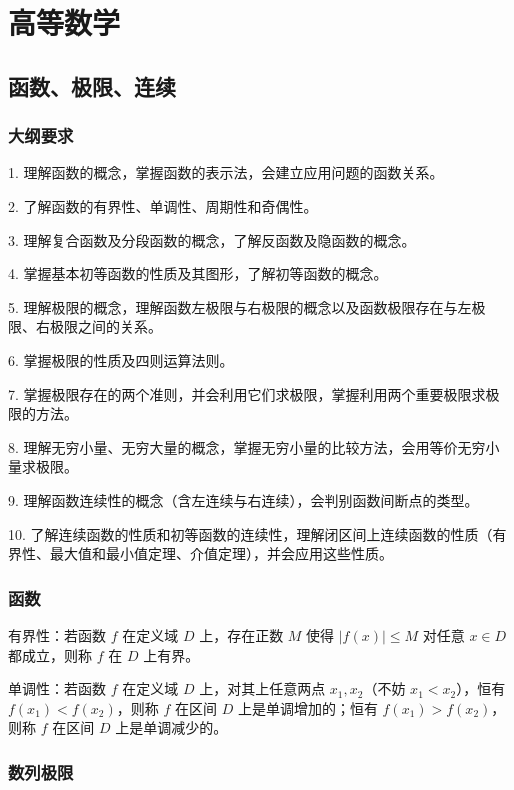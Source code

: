 \chapter{高等数学}

\section{函数、极限、连续}

\subsection{大纲要求}

1. 理解函数的概念，掌握函数的表示法，会建立应用问题的函数关系。

2. 了解函数的有界性、单调性、周期性和奇偶性。

3. 理解复合函数及分段函数的概念，了解反函数及隐函数的概念。

4. 掌握基本初等函数的性质及其图形，了解初等函数的概念。

5. 理解极限的概念，理解函数左极限与右极限的概念以及函数极限存在与左极限、右极限之间的关系。

6. 掌握极限的性质及四则运算法则。

7. 掌握极限存在的两个准则，并会利用它们求极限，掌握利用两个重要极限求极限的方法。

8. 理解无穷小量、无穷大量的概念，掌握无穷小量的比较方法，会用等价无穷小量求极限。

9. 理解函数连续性的概念（含左连续与右连续），会判别函数间断点的类型。

10. 了解连续函数的性质和初等函数的连续性，理解闭区间上连续函数的性质（有界性、最大值和最小值定理、介值定理），并会应用这些性质。

\subsection{函数}

有界性：若函数 $f$ 在定义域 $D$ 上，存在正数 $M$ 使得 $|f(x)| \leqslant M$ 对任意 $x \in D$ 都成立，则称 $f$ 在 $D$ 上有界。

单调性：若函数 $f$ 在定义域 $D$ 上，对其上任意两点 $x_1, x_2$（不妨 $x_1 < x_2$），恒有 $f(x_1) < f(x_2)$，则称 $f$ 在区间 $D$ 上是单调增加的；恒有 $f(x_1) > f(x_2)$，则称 $f$ 在区间 $D$ 上是单调减少的。

\subsection{数列极限}

